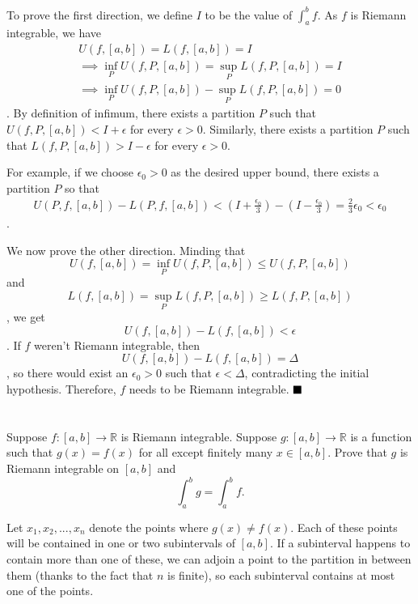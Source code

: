 \documentclass[11pt, a4paper, tikz]{article}
\newcommand{\centsection}[1]{
	\section*{\centering{#1}}
}
\renewcommand{\qed}{\hfill\blacksquare}
\begin{document}
	To prove the first direction, we define $I$ to be the value of $\int_{a}^{b}f$. As $f$ is Riemann integrable, we have \begin{align*}
		U(f,[a,b])=L(f,[a,b])=I\\
		\implies\inf_PU(f,P,[a,b])=\sup_PL(f,P,[a,b])=I\\ \implies\inf_PU(f,P,[a,b])-\sup_PL(f,P,[a,b])=0
	\end{align*}.
	By definition of infimum, there exists a partition $P$ such that $U(f,P,[a,b])< I+\epsilon$ for every $\epsilon>0$. Similarly, there exists a partition $P$ such that $L(f,P,[a,b])>I-\epsilon$ for every $\epsilon>0$.
	
	For example, if we choose $\epsilon_0>0$ as the desired upper bound, there exists a partition $P$ so that
	\begin{align*}
		U(P,f,[a,b])-L(P,f,[a,b])<(I+\frac{\epsilon_0}{3})-(I-\frac{\epsilon_0}{3})=\frac{2}{3}\epsilon_0 < \epsilon_0
	\end{align*}.
	
	We now prove the other direction. Minding that \[U(f,[a,b])=\inf_PU(f,P,[a,b])\leq U(f,P,[a,b])\] and \[L(f,[a,b])=\sup_PL(f,P,[a,b])\geq L(f,P,[a,b])\], we get \[U(f,[a,b])-L(f,[a,b])<\epsilon\]. If $f$ weren't Riemann integrable, then \[U(f,[a,b])-L(f,[a,b])=\Delta\], so there would exist an $\epsilon_0>0$ such that $\epsilon<\Delta$, contradicting the initial hypothesis. Therefore, $f$ needs to be Riemann integrable.
	$\qed$
	
	\centsection{Exercise 6}
	
	\begin{formulationBox}
		Suppose $f:[a,b]\rightarrow\mathbb{R}$ is Riemann integrable. Suppose $g:[a,b]\rightarrow\mathbb{R}$ is a function such that $g(x) = f(x)$ for all except finitely many $x\in[a,b]$. Prove that $g$ is Riemann integrable on $[a,b]$ and \[\int_a^bg=\int_a^bf.\]
	\end{formulationBox}

	Let $x_1, x_2, ..., x_n$ denote the points where $g(x)\neq f(x)$. Each of these points will be contained in one or two subintervals of $[a,b]$. If a subinterval happens to contain more than one of these, we can adjoin a point to the partition in between them (thanks to the fact that $n$ is finite), so each subinterval contains at most one of the points.
	
\end{document}
